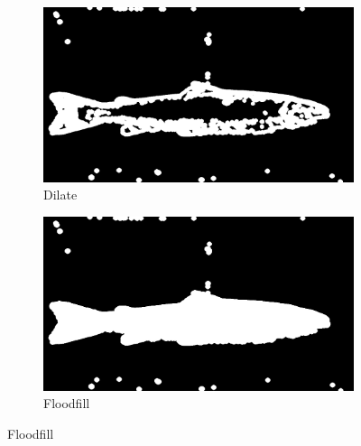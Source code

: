 \begin{figure}[H]
    \medskip
    \begin{subfigure}{0.48\textwidth}
        \includegraphics[width=\linewidth]{images/implementation/4_3_dilate}
        \caption{Dilate} 
        \label{fig:dilate_contour}
    \end{subfigure}\hspace*{\fill}
    \begin{subfigure}{0.48\textwidth}
        \includegraphics[width=\linewidth]{images/implementation/4_4_floodfill}
        \caption{Floodfill} 
        \label{fig:floodfill}
    \end{subfigure}
    

\end{figure}
